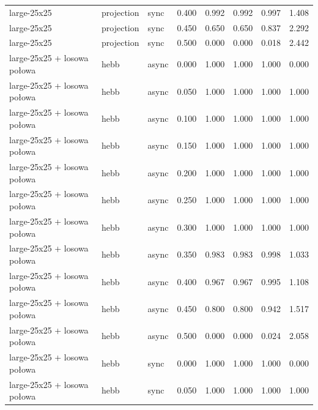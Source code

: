 \begin{tabular}{lllrrrrr}
large-25x25 & projection & sync & 0.400 & 0.992 & 0.992 & 0.997 & 1.408 \\

large-25x25 & projection & sync & 0.450 & 0.650 & 0.650 & 0.837 & 2.292 \\

large-25x25 & projection & sync & 0.500 & 0.000 & 0.000 & 0.018 & 2.442 \\

large-25x25 + losowa połowa & hebb & async & 0.000 & 1.000 & 1.000 & 1.000 & 0.000 \\

large-25x25 + losowa połowa & hebb & async & 0.050 & 1.000 & 1.000 & 1.000 & 1.000 \\

large-25x25 + losowa połowa & hebb & async & 0.100 & 1.000 & 1.000 & 1.000 & 1.000 \\

large-25x25 + losowa połowa & hebb & async & 0.150 & 1.000 & 1.000 & 1.000 & 1.000 \\

large-25x25 + losowa połowa & hebb & async & 0.200 & 1.000 & 1.000 & 1.000 & 1.000 \\

large-25x25 + losowa połowa & hebb & async & 0.250 & 1.000 & 1.000 & 1.000 & 1.000 \\

large-25x25 + losowa połowa & hebb & async & 0.300 & 1.000 & 1.000 & 1.000 & 1.000 \\

large-25x25 + losowa połowa & hebb & async & 0.350 & 0.983 & 0.983 & 0.998 & 1.033 \\

large-25x25 + losowa połowa & hebb & async & 0.400 & 0.967 & 0.967 & 0.995 & 1.108 \\

large-25x25 + losowa połowa & hebb & async & 0.450 & 0.800 & 0.800 & 0.942 & 1.517 \\

large-25x25 + losowa połowa & hebb & async & 0.500 & 0.000 & 0.000 & 0.024 & 2.058 \\

large-25x25 + losowa połowa & hebb & sync & 0.000 & 1.000 & 1.000 & 1.000 & 0.000 \\

large-25x25 + losowa połowa & hebb & sync & 0.050 & 1.000 & 1.000 & 1.000 & 1.000 \\


\end{tabular}
